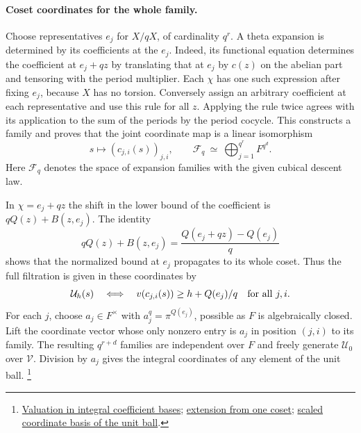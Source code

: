 \paragraph{Coset coordinates for the whole family.}
Choose representatives \(e_j\) for \(X/qX\), of cardinality \(q^r\).
A theta expansion is determined by its coefficients at the \(e_j\).
Indeed, its functional equation determines the coefficient at
\(e_j+qz\) by translating that at \(e_j\) by \(c(z)\) on the
abelian part and tensoring with the period multiplier. Each
\(\chi\) has one such expression after fixing \(e_j\), because \(X\)
has no torsion. Conversely assign an arbitrary coefficient at each
representative and use this rule for all \(z\). Applying the rule
twice agrees with its application to the sum of the periods by
the period cocycle. This constructs a family and proves that
the joint coordinate map is a linear isomorphism
\[
     s\longmapsto(c_{j,i}(s))_{j,i},\qquad
     \mathcal F_q \ \simeq\
               \bigoplus_{j=1}^{q^r} F^{q^d}.
\]
Here \(\mathcal F_q\) denotes the space of expansion families
with the given cubical descent law.

In \(\chi=e_j+qz\) the shift in the lower bound of the coefficient
is \(qQ(z)+B(z,e_j)\). The identity
\[
 qQ(z)+B(z,e_j)
       =\frac{Q(e_j+qz)-Q(e_j)}{q}
\]
shows that the normalized bound at \(e_j\) propagates to its
whole coset. Thus the full filtration is given in these coordinates by
\[
 \mathcal U_h(s)\quad\Longleftrightarrow\quad
          v(c_{j,i}(s))\ge h+Q(e_j)/q\quad\hbox{for all }j,i .
\]
For each \(j\), choose \(a_j\in F^\times\) with
\(a_j^q=\pi^{Q(e_j)}\), possible as \(F\) is algebraically closed.
Lift the coordinate vector whose only nonzero entry is \(a_j\) in
position \((j,i)\) to its family. The resulting \(q^{r+d}\) families
are independent over \(F\) and freely generate \(\mathcal U_0\)
over \(\mathcal V\). Division by \(a_j\) gives the integral
coordinates of any element of the unit ball.
\footnote{\href{https://github.com/ChristianKudeba/alpoge-rh-verification/blob/alpoge-source-7cbf7a0c/src/Development/AbelianVarietyTheory/Proofs/RingsOfIntegers/ExistsBasisOfEq.lean}{Valuation in integral coefficient bases};
\href{https://github.com/ChristianKudeba/alpoge-rh-verification/blob/alpoge-source-7cbf7a0c/src/ReciprocityTheory/ReductiveGroups/ArithmeticGeometry/DiscreteValuationRings/ExistsFamRep.lean}{extension from one coset};
\href{https://github.com/ChristianKudeba/alpoge-rh-verification/blob/alpoge-source-7cbf7a0c/src/Development/AbelianVarietyTheory/Proofs/RingsOfIntegers/ExistsBasisOfCoord.lean}{scaled coordinate basis of the unit ball}.}

